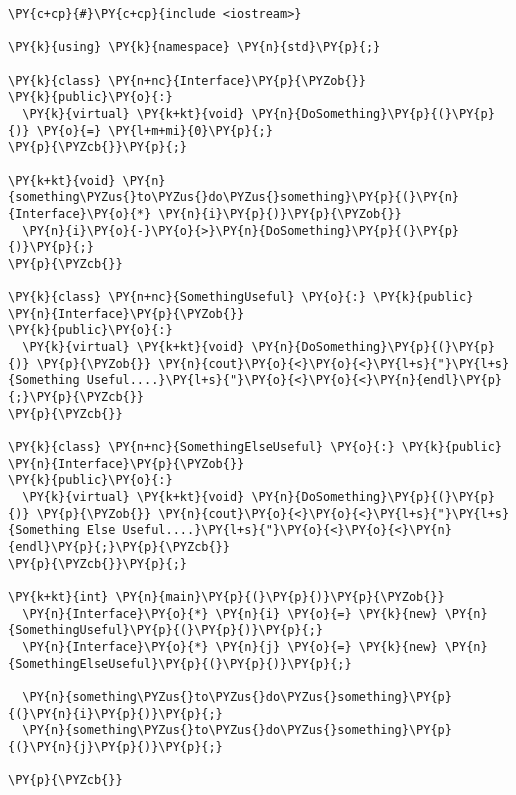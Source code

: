 \begin{Verbatim}[commandchars=\\\{\}]
\PY{c+cp}{#}\PY{c+cp}{include <iostream>}

\PY{k}{using} \PY{k}{namespace} \PY{n}{std}\PY{p}{;}

\PY{k}{class} \PY{n+nc}{Interface}\PY{p}{\PYZob{}}
\PY{k}{public}\PY{o}{:}
  \PY{k}{virtual} \PY{k+kt}{void} \PY{n}{DoSomething}\PY{p}{(}\PY{p}{)} \PY{o}{=} \PY{l+m+mi}{0}\PY{p}{;}
\PY{p}{\PYZcb{}}\PY{p}{;}

\PY{k+kt}{void} \PY{n}{something\PYZus{}to\PYZus{}do\PYZus{}something}\PY{p}{(}\PY{n}{Interface}\PY{o}{*} \PY{n}{i}\PY{p}{)}\PY{p}{\PYZob{}}
  \PY{n}{i}\PY{o}{-}\PY{o}{>}\PY{n}{DoSomething}\PY{p}{(}\PY{p}{)}\PY{p}{;}
\PY{p}{\PYZcb{}}

\PY{k}{class} \PY{n+nc}{SomethingUseful} \PY{o}{:} \PY{k}{public} \PY{n}{Interface}\PY{p}{\PYZob{}}
\PY{k}{public}\PY{o}{:}
  \PY{k}{virtual} \PY{k+kt}{void} \PY{n}{DoSomething}\PY{p}{(}\PY{p}{)} \PY{p}{\PYZob{}} \PY{n}{cout}\PY{o}{<}\PY{o}{<}\PY{l+s}{"}\PY{l+s}{Something Useful....}\PY{l+s}{"}\PY{o}{<}\PY{o}{<}\PY{n}{endl}\PY{p}{;}\PY{p}{\PYZcb{}}
\PY{p}{\PYZcb{}}

\PY{k}{class} \PY{n+nc}{SomethingElseUseful} \PY{o}{:} \PY{k}{public} \PY{n}{Interface}\PY{p}{\PYZob{}}
\PY{k}{public}\PY{o}{:}
  \PY{k}{virtual} \PY{k+kt}{void} \PY{n}{DoSomething}\PY{p}{(}\PY{p}{)} \PY{p}{\PYZob{}} \PY{n}{cout}\PY{o}{<}\PY{o}{<}\PY{l+s}{"}\PY{l+s}{Something Else Useful....}\PY{l+s}{"}\PY{o}{<}\PY{o}{<}\PY{n}{endl}\PY{p}{;}\PY{p}{\PYZcb{}}
\PY{p}{\PYZcb{}}\PY{p}{;}

\PY{k+kt}{int} \PY{n}{main}\PY{p}{(}\PY{p}{)}\PY{p}{\PYZob{}}
  \PY{n}{Interface}\PY{o}{*} \PY{n}{i} \PY{o}{=} \PY{k}{new} \PY{n}{SomethingUseful}\PY{p}{(}\PY{p}{)}\PY{p}{;}
  \PY{n}{Interface}\PY{o}{*} \PY{n}{j} \PY{o}{=} \PY{k}{new} \PY{n}{SomethingElseUseful}\PY{p}{(}\PY{p}{)}\PY{p}{;}
  
  \PY{n}{something\PYZus{}to\PYZus{}do\PYZus{}something}\PY{p}{(}\PY{n}{i}\PY{p}{)}\PY{p}{;}
  \PY{n}{something\PYZus{}to\PYZus{}do\PYZus{}something}\PY{p}{(}\PY{n}{j}\PY{p}{)}\PY{p}{;}
  
\PY{p}{\PYZcb{}}
\end{Verbatim}
